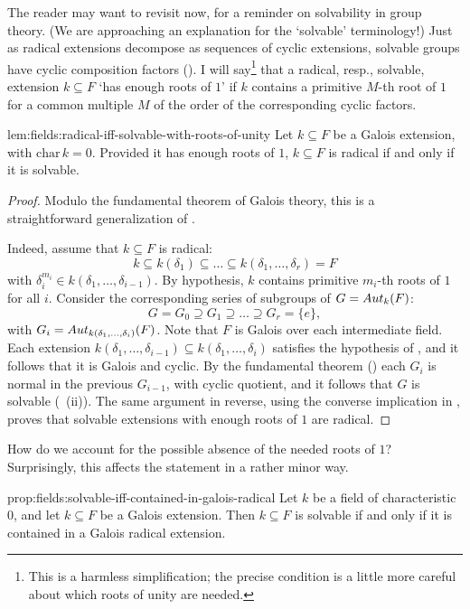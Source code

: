 The reader may want to revisit
now, for a reminder on solvability in group theory. (We are
approaching an explanation for the `solvable' terminology!) Just as
radical extensions decompose as sequences of cyclic extensions,
solvable groups have cyclic composition factors
(). I will say\footnote{This is a
  harmless simplification; the precise condition is a little more
  careful about which roots of unity are needed.} that a radical,
resp., solvable, extension $k \subseteq F$ `has enough roots of $1$'
if $k$ contains a primitive $M$-th root of $1$ for a common multiple
$M$ of the order of the corresponding cyclic factors.
\begin{lem}{}{lem:fields:radical-iff-solvable-with-roots-of-unity}
  Let $k \subseteq F$ be a Galois extension, with
  $\mathrm{char}\,k = 0$.  Provided it has enough roots of $1$,
  $k \subseteq F$ is radical if and only if it is solvable.
\end{lem}
\begin{proof}
  Modulo the fundamental theorem of Galois theory, this is a
  straightforward generalization of .

  Indeed, assume that $k \subseteq F$ is radical:
  \[
    k \subseteq k(\delta_1) \subseteq \dots \subseteq k(\delta_1,
    \dots, \delta_r) = F
  \]
  with $\delta_i^{m_i} \in k(\delta_1, \dots, \delta_{i-1})$. By
  hypothesis, $k$ contains primitive $m_i$-th roots of $1$ for all
  $i$.  Consider the corresponding series of subgroups of
  $G = Aut_k(F)$:
  \[
    G = G_0 \supseteq G_1 \supseteq \dots \supseteq G_r = \{e\},
  \]
  with $G_i = Aut_{k(\delta_1,\dots,\delta_i)}(F)$. Note that $F$ is
  Galois over each intermediate field. Each extension
  $k(\delta_1, \dots, \delta_{i-1}) \subseteq k(\delta_1, \dots,
  \delta_i)$ satisfies the hypothesis of , and
  it follows that it is Galois and cyclic. By the fundamental theorem
  () each $G_i$ is normal in the previous
  $G_{i-1}$, with cyclic quotient, and it follows that $G$ is solvable
  (~(ii)). The same argument in
  reverse, using the converse implication in ,
  proves that solvable extensions with enough roots of $1$ are
  radical.
\end{proof}
How do we account for the possible absence of the needed roots of $1$?
Surprisingly, this affects the statement in a rather minor way.
\begin{prop}{}{prop:fields:solvable-iff-contained-in-galois-radical}
  Let $k$ be a field of characteristic $0$, and let $k \subseteq F$ be
  a Galois extension. Then $k \subseteq F$ is solvable if and only if
  it is contained in a Galois radical extension.
\end{prop}

